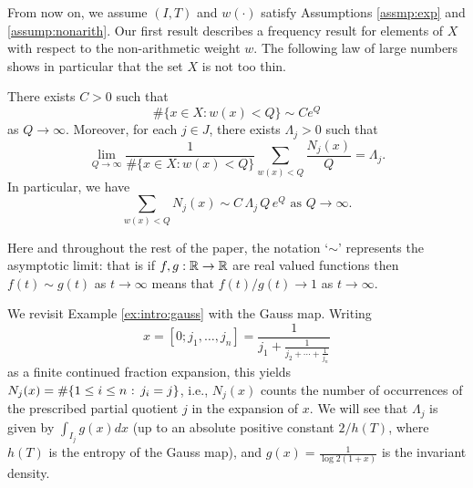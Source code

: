 \documentclass[12pt,a4paper,reqno]{amsart}
\begin{document}
From now on, we assume  $(I,T)$ and $w(\cdot)$ satisfy Assumptions \ref{assmp:exp} and \ref{assump:nonarith}. Our first result describes a frequency result for  elements of $X$ with respect to the non-arithmetic weight $w$.
The following law of large numbers shows in particular that the set $X$ is not  too thin.

\begin{theorem}\label{thm.firstmoment}
There  exists $C>0$ such that $$\#\{x \in X : w(x) < Q\} \sim C e^{Q}$$ as $Q \to \infty$.
Moreover,
for each $j \in J$, there exists $\Lambda_j > 0$ such that
\[
\lim_{Q\to\infty} \frac{1}{\#\{x \in   X : w(x) < Q\}}\sum_{w(x) < Q}  \frac{N_j(x)}{Q}  = \Lambda_j. 
\]
In particular, we have \[
\sum_{w(x) < Q}  N_j(x)  \sim C \, \Lambda_j  \, Q\, e^{Q}
\mbox{ as }Q \to \infty.\]
\end{theorem}
Here and throughout the rest of the paper, the notation `$\sim$' represents the asymptotic limit: that is if $f,g : {\mathbb R} \to {\mathbb R}$ are real valued functions then $f(t) \sim g(t)$ as $t \to\infty$ means that $f(t)/g(t) \to 1$ as $t\to\infty$.

\begin{example} \label{expl:gauss}
 We revisit Example \ref{ex:intro:gauss}  with 
 the Gauss map. %
 Writing 
 $$x = [0; j_1, \ldots, j_{n}] = \frac{1}{j_1 + \frac{1}{j_2 + \cdots + \frac{1}{j_n}}}$$
 as a finite continued fraction expansion, this  yields  $ N_j(x) = \#\{1 \leq i \leq n \hbox{ : }  j_i = j \}$, i.e., $  N_j(x)$ counts the number of
  occurrences of the prescribed partial quotient  $j$  in the expansion of $x$.  We will see that $\Lambda_j$ is given by $ \int_{I_j} g(x)dx$ (up to an absolute positive constant $2/h(T)$,
  where $h(T)$ is the entropy of the Gauss map),   and $g(x)=\frac{1}{\log 2 (1+x)}$ is the invariant density.  
  
\end{example}
\end{document}
